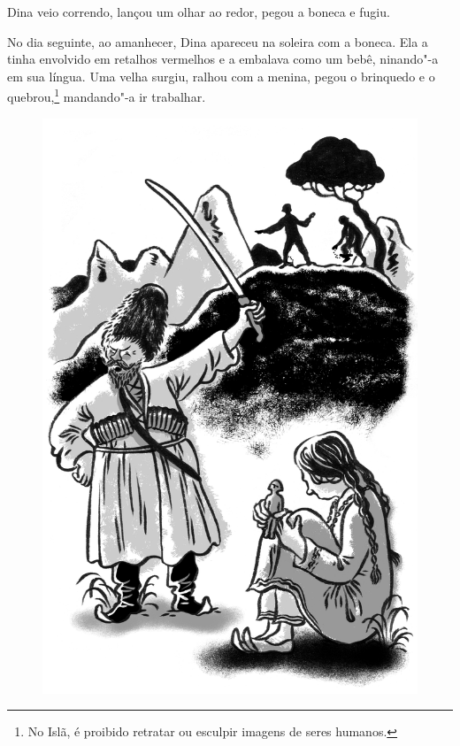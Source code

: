 Dina veio correndo, lançou um olhar ao redor, pegou a boneca e fugiu.

No dia seguinte, ao amanhecer, Dina apareceu na soleira com a boneca.
Ela a tinha envolvido em retalhos vermelhos e a embalava como um bebê,
ninando"-a em sua língua. Uma velha surgiu, ralhou com a menina, pegou o
brinquedo e o quebrou,\footnote{No Islã, é proibido retratar ou
  esculpir imagens de seres humanos.} mandando"-a ir trabalhar.

\begin{figure}%
\vspace*{-1.6cm}
\hspace*{-1.8cm}\includegraphics{./imgs/cena4.jpg}
\end{figure}

